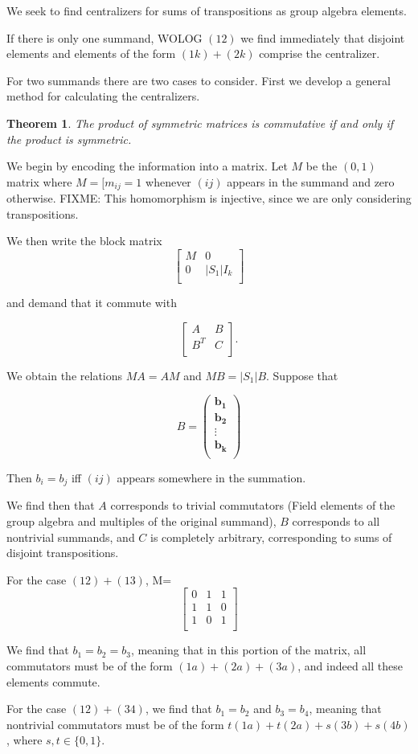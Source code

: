 \documentclass[12pt,letterpaper]{article}
\newtheorem{theorem}{Theorem}
\begin{document}
We seek to find centralizers for sums of transpositions as group
algebra elements.

If there is only one summand, WOLOG $(12)$ we find immediately that disjoint
elements and elements of the form $(1k)+(2k)$ comprise the
centralizer.

For two summands there are two cases to consider. First we develop a
general method for calculating the centralizers.

\begin{theorem}
The product of symmetric matrices is commutative if and only if the
product is symmetric.
\end{theorem}

We begin by encoding the information into a matrix. Let $M$ be the $(0,1)$
matrix where $M=[m_{ij}=1$ whenever $(ij)$ appears in the summand and
zero otherwise. FIXME: This homomorphism is injective, since we are
only considering transpositions.

We then write the block matrix 
$$ \left[
\begin{array}{cc}
M & 0\\ 
0 & |S_1|I_k\\
\end{array}
\right ]
$$

and demand that it commute with 

$$
\left[
\begin{array}{cc}
A & B \\
B^T & C\\
\end{array}\right] .
$$

We obtain the relations $MA=AM$ and $MB=|S_1|B$. Suppose that 

\[
B= \left(
\begin{array}{c}
\mathbf{b_1}\\
\mathbf{b_2}\\
\vdots\\
\mathbf{b_k}\\
\end{array}
\right)
\]

Then $b_i=b_j$ iff $(ij)$ appears somewhere in the summation.

We find then that $A$ corresponds to trivial commutators (Field
elements of the group algebra and multiples of the original summand),
$B$ corresponds to all nontrivial summands, and $C$ is completely
arbitrary, corresponding to sums of disjoint transpositions.

For the case $(12)+(13)$,
M= \[
\left[
\begin{array}{ccc}
0 & 1 & 1\\
1 & 1 & 0\\
1 & 0 & 1\\
\end{array}\right]
\]

We find that $b_1=b_2=b_3$, meaning that in this portion of the
matrix, all commutators must be of the form $(1a)+(2a)+(3a)$, and
indeed all these elements commute. 

For the case $(12)+(34)$, we find that $b_1=b_2$ and $b_3=b_4$,
meaning that nontrivial commutators must be of the form
$t(1a)+t(2a)+s(3b)+s(4b)$, where $s,t\in\{0,1\}$. 
\end{document}
